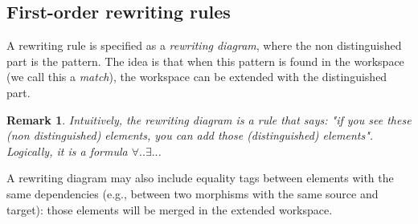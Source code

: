 \documentclass{article}
\newtheorem{remark}{Remark}[section]
\begin{document}
\subsection{First-order rewriting rules}
A rewriting rule is specified as a \emph{rewriting diagram}, where the non distinguished part is the pattern. The idea is that when this pattern is found in the workspace (we call this a \emph{match}), the workspace can be extended with the distinguished part.

\begin{remark}
    Intuitively, the rewriting diagram is a rule that says: "if you see these (non distinguished) elements, you can add those (distinguished) elements". Logically, it is a formula $∀ .. ∃ .. $.    
\end{remark}

A rewriting diagram may also include equality tags between elements with the same dependencies (e.g., between two morphisms with the same source and target): those elements will be merged in the extended workspace.
\end{document}

